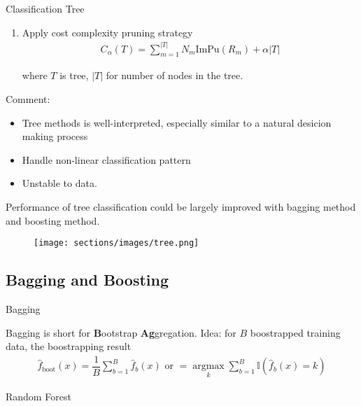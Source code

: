 \begin{algorithm}{Classification Tree}
\begin{enumerate}[topsep=2pt,itemsep=2pt]
        \item Apply cost complexity pruning strategy
        \begin{align}
            C_\alpha (T) =\sum_{m=1}^{|T|}N_m\mathrm{ImPu}(R_m)+\alpha |T|
        \end{align}
        
        where $ T $ is tree, $ |T| $ for number of nodes in the tree.
        
    \end{enumerate}
    
        
    
\end{algorithm}
    

    Comment:
\begin{itemize}[topsep=2pt,itemsep=0pt]
    \item Tree methods is well-interpreted, especially similar to a natural desicion making process
    \item Handle non-linear classification pattern
    \item Unstable to data.
\end{itemize}

    Performance of tree classification could be largely improved with bagging method and boosting method.

\begin{figure}[H]
    \centering
    \texttt{[image: sections/images/tree.png]}
    \caption{}
    \label{}
\end{figure}


\subsection{Bagging and Boosting}
    
\begin{point}
    Bagging
\end{point}

    Bagging is short for \textbf{B}ootstrap \textbf{Ag}gregation. Idea: for $ B $ boostrapped training data, the boostrapping result
    \begin{align}
        \hat{f}_\mathrm{boot}(x)=\dfrac{1}{B}\sum_{b=1}^B\hat{f}_b(x)  \text{ or }=\mathop{\arg\max}\limits_{k} \sum_{b=1}^B\mathbb{I}(\hat{f}_b(x)=k)
    \end{align}

\begin{point}
    Random Forest
\end{point}

